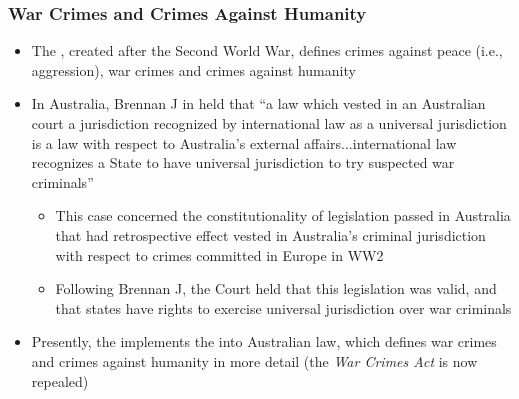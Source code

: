 \subsubsection{War Crimes and Crimes Against Humanity}
\begin{itemize}
    \item The , created after the Second World War, defines crimes against peace (i.e., aggression), war crimes and crimes against humanity
    \item In Australia, Brennan J in  held that ``a law which vested in an Australian court a jurisdiction recognized by international law as a universal jurisdiction is a law with respect to Australia's external affairs...international law recognizes a State to have universal jurisdiction to try suspected war criminals''
    \begin{itemize}
        \item This case concerned the constitutionality of legislation passed in Australia that had retrospective effect vested in Australia's criminal jurisdiction with respect to crimes committed in Europe in WW2
        \item Following Brennan J, the Court held that this legislation was valid, and that states have rights to exercise universal jurisdiction over war criminals
    \end{itemize}
    \item Presently, the  implements the  into Australian law, which defines war crimes and crimes against humanity in more detail (the \textit{War Crimes Act} is now repealed)
\end{itemize}

